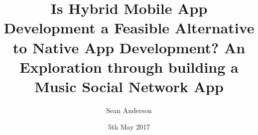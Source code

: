 
\title{Is Hybrid Mobile App Development a Feasible Alternative to Native App Development? An Exploration through building a Music Social Network App}

\author{Sean Anderson}




\date{5th May 2017} %




\maketitle



